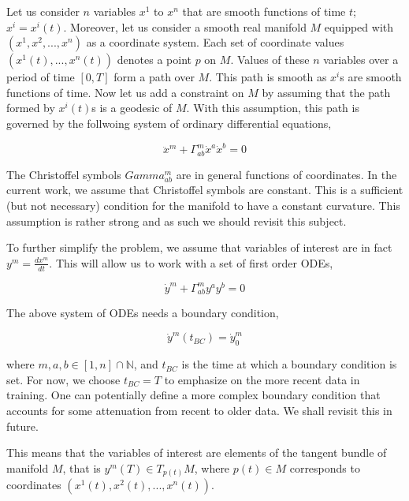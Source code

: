 \documentclass{article}
\begin{document}
Let us consider $n$ variables $x^{1}$ to $x^{n}$ that are smooth
functions of time $t$; $x^{i} = x^{i}(t)$. Moreover, let us consider a
smooth real manifold $M$ equipped with $(x^{1},x^{2},...,x^{n})$ as a
coordinate system. Each set of coordinate values
$(x^{1}(t),...,x^{n}(t))$ denotes a point $p$ on $M$. Values of these
$n$ variables over a period of time $[0,T]$ form a path over $M$. This
path is smooth as $x^{i}$s are smooth functions of time. Now let us
add a constraint on $M$ by assuming that the path formed by
$x^{i}(t)$s is a geodesic of $M$. With this assumption, this path is
governed by the follwoing system of ordinary differential equations,

\begin{equation}\label{eqn:geodesic}
\ddot{x}^{m} + \Gamma^{m}_{ab} \dot{x}^{a} \dot{x}^{b} = 0
\end{equation}

The Christoffel symbols $Gamma^{m}_{ab}$ are in general functions of
coordinates. In the current work, we assume that Christoffel symbols
are constant. This is a sufficient (but not necessary) condition for
the manifold to have a constant curvature. This assumption is rather
strong and as such we should revisit this subject.

To further simplify the problem, we assume that variables of interest
are in fact $y^{m} = \frac{dx^{m}}{dt}$. This will allow us to work
with a set of first order ODEs,

\begin{equation}\label{eqn:geodesic-1st-order}
\dot{y}^{m} + \Gamma^{m}_{ab} y^{a} y^{b} = 0
\end{equation}

The above system of ODEs needs a boundary condition,

\begin{equation}\label{eqn:geodesic-bc}
\dot{y}^{m}(t_{BC}) = \dot{y}^{m}_{0}
\end{equation}

where $m,a,b \in [1,n] \cap \mathbb{N}$, and $t_{BC}$ is the time at
which a boundary condition is set. For now, we choose $t_{BC} = T$ to
emphasize on the more recent data in training. One can potentially
define a more complex boundary condition that accounts for some
attenuation from recent to older data. We shall revisit this in
future.

This means that the variables of interest are elements of the tangent
bundle of manifold $M$, that is $y^{m}(T) \in T_{p(t)}M$, where $p(t) \in M$
corresponds to coordinates $(x^{1}(t),x^{2}(t),...,x^{n}(t))$.
\end{document}
